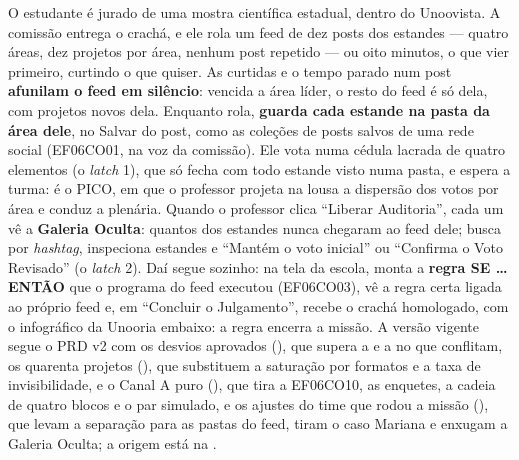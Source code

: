 O estudante é jurado de uma mostra científica estadual, dentro do Unoovista. A
comissão entrega o crachá, e ele rola um feed de dez posts dos estandes ---
quatro áreas, dez projetos por área, nenhum post repetido --- ou oito minutos,
o que vier primeiro, curtindo o que quiser. As curtidas e o tempo parado num
post \textbf{afunilam o feed em silêncio}: vencida a área líder, o resto do
feed é só dela, com projetos novos dela. Enquanto rola, \textbf{guarda cada
estande na pasta da área dele}, no Salvar do post, como as coleções de posts
salvos de uma rede social (EF06CO01, na voz da comissão). Ele vota numa cédula
lacrada de quatro elementos (o \emph{latch} 1), que só fecha com todo estande
visto numa pasta, e espera a turma: é o PICO, em
que o professor projeta na lousa a dispersão dos votos por área e conduz a
plenária. Quando o professor clica \enquote{Liberar Auditoria}, cada um vê a
\textbf{Galeria Oculta}: quantos dos estandes nunca chegaram ao feed dele;
busca por \emph{hashtag}, inspeciona estandes e \enquote{Mantém o voto
inicial} ou \enquote{Confirma o Voto Revisado} (o \emph{latch} 2). Daí segue
sozinho: na tela da escola, monta a \textbf{regra SE \ldots{} ENTÃO} que o
programa do feed executou (EF06CO03), vê a regra certa ligada ao próprio feed
e, em \enquote{Concluir o Julgamento}, recebe o crachá homologado, com o
infográfico da Unooria embaixo: a regra encerra a missão. A versão
vigente segue o PRD v2 com os desvios aprovados (), que supera a
 e a  no que conflitam, os quarenta projetos
(), que substituem a saturação por formatos e a taxa de
invisibilidade, e o Canal A puro (), que tira a EF06CO10, as
enquetes, a cadeia de quatro blocos e o par simulado, e os ajustes do time
que rodou a missão (), que levam a separação para as pastas do
feed, tiram o caso Mariana e enxugam a Galeria Oculta; a origem está na
.

